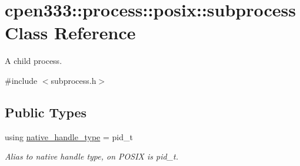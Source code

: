 \hypertarget{classcpen333_1_1process_1_1posix_1_1subprocess}{}\section{cpen333\+:\+:process\+:\+:posix\+:\+:subprocess Class Reference}
\label{classcpen333_1_1process_1_1posix_1_1subprocess}


A child process.  




{\ttfamily \#include $<$subprocess.\+h$>$}

\subsection*{Public Types}
\begin{DoxyCompactItemize}
\item 
\mbox{\label{classcpen333_1_1process_1_1posix_1_1subprocess_a84a93cb8471fd6314591abc6e747fcf4}} 
using \hyperlink{classcpen333_1_1process_1_1posix_1_1subprocess_a84a93cb8471fd6314591abc6e747fcf4}{native\+\_\+handle\+\_\+type} = pid\+\_\+t
\begin{DoxyCompactList}\small\item\em Alias to native handle type, on P\+O\+S\+IX is pid\+\_\+t. \end{DoxyCompactList}\end{DoxyCompactItemize}
